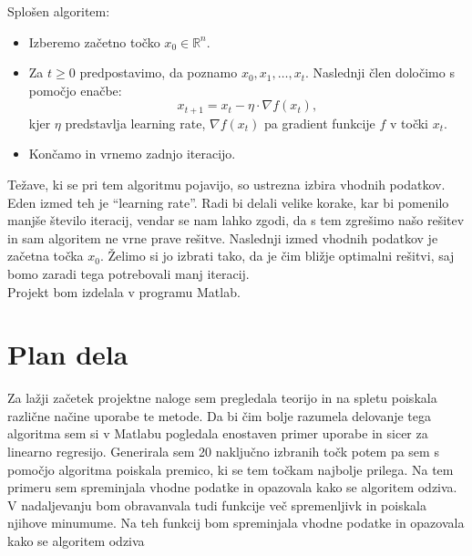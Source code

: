 \documentclass{article}
\begin{document}
Splošen algoritem:
\begin{itemize}
\item{Izberemo začetno točko $x_0 \in \mathbb{R}^n $. }
\item{Za $t \geq 0$ predpostavimo, da poznamo $x_0,x_1, \ldots ,x_t $. Naslednji člen določimo s pomočjo enačbe: 
\[ x_{t+1}=x_t - \eta \cdot \nabla f(x_t), \] 
kjer $ \eta$ predstavlja learning rate, $\nabla f(x_t) $ pa gradient funkcije $f$ v točki $x_t$.}
\item{Končamo in vrnemo zadnjo iteracijo.}
\end{itemize}

Težave, ki se pri tem algoritmu pojavijo, so ustrezna izbira vhodnih podatkov. Eden izmed teh je ``learning rate''. Radi bi delali velike korake, kar bi pomenilo manjše število iteracij, vendar se nam lahko zgodi, da s tem zgrešimo našo rešitev in sam algoritem ne vrne prave rešitve. Naslednji izmed vhodnih podatkov je začetna točka $x_0$. Želimo si jo izbrati tako, da je čim bližje optimalni rešitvi, saj bomo zaradi tega potrebovali manj iteracij.\\

Projekt bom izdelala v programu Matlab.

\section{Plan dela}
Za lažji začetek projektne naloge sem pregledala teorijo in na spletu poiskala različne načine uporabe te metode. Da bi čim bolje razumela delovanje tega algoritma sem si v Matlabu pogledala enostaven primer uporabe in sicer za linearno regresijo. Generirala sem 20 naključno izbranih točk potem pa sem s pomočjo algoritma poiskala premico, ki se tem točkam najbolje prilega. Na tem primeru sem spreminjala vhodne podatke in opazovala kako se algoritem odziva.\\

V nadaljevanju bom obravanvala tudi funkcije več spremenljivk in poiskala njihove minumume. Na teh funkcij bom spreminjala vhodne podatke in opazovala kako se algoritem odziva
\end{document}
